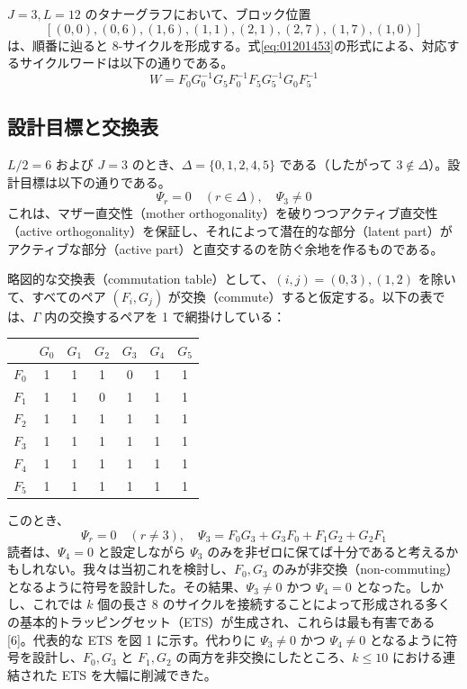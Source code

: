 \documentclass[a4paper,11pt,dvipdfmx]{jsarticle}
\theoremstyle{definition}
\begin{document}
$J = 3, L = 12$ のタナーグラフにおいて、ブロック位置
\[
[(0, 0), (0, 6), (1, 6), (1, 1), (2, 1), (2, 7), (1, 7), (1, 0)]
\]
は、順番に辿ると 8-サイクルを形成する。式\eqref{eq:01201453}の形式による、対応するサイクルワードは以下の通りである。
\[
W = F_0 G_0^{-1} G_5 F_0^{-1} F_5 G_5^{-1} G_0 F_5^{-1}
\]

\subsection{設計目標と交換表}

$L/2 = 6$ および $J = 3$ のとき、$\Delta = \{0, 1, 2, 4, 5\}$ である（したがって $3 \notin \Delta$）。設計目標は以下の通りである。
\[
\Psi_r = 0 \quad (r \in \Delta), \quad \Psi_3 \neq 0
\]
これは、マザー直交性（mother orthogonality）を破りつつアクティブ直交性（active orthogonality）を保証し、それによって潜在的な部分（latent part）がアクティブな部分（active part）と直交するのを防ぐ余地を作るものである。

略図的な交換表（commutation table）として、$(i, j) = (0, 3), (1, 2)$ を除いて、すべてのペア $(F_i, G_j)$ が交換（commute）すると仮定する。以下の表では、$\Gamma$ 内の交換するペアを 1 で網掛けしている：

\begin{table}[h]
\centering
\begin{tabular}{c|cccccc}
      & $G_0$ & $G_1$ & $G_2$ & $G_3$ & $G_4$ & $G_5$ \\ \hline
$F_0$ & 1     & 1     & 1     & 0     & 1     & 1     \\
$F_1$ & 1     & 1     & 0     & 1     & 1     & 1     \\
$F_2$ & 1     & 1     & 1     & 1     & 1     & 1     \\
$F_3$ & 1     & 1     & 1     & 1     & 1     & 1     \\
$F_4$ & 1     & 1     & 1     & 1     & 1     & 1     \\
$F_5$ & 1     & 1     & 1     & 1     & 1     & 1     \\
\end{tabular}
\end{table}

このとき、
\[
\Psi_r = 0 \quad (r \neq 3), \quad \Psi_3 = F_0 G_3 + G_3 F_0 + F_1 G_2 + G_2 F_1
\]
読者は、$\Psi_4 = 0$ と設定しながら $\Psi_3$ のみを非ゼロに保てば十分であると考えるかもしれない。我々は当初これを検討し、$F_0, G_3$ のみが非交換（non-commuting）となるように符号を設計した。その結果、$\Psi_3 \neq 0$ かつ $\Psi_4 = 0$ となった。しかし、これでは $k$ 個の長さ 8 のサイクルを接続することによって形成される多くの基本的トラッピングセット（ETS）が生成され、これらは最も有害である [6]。代表的な ETS を図 1 に示す。代わりに $\Psi_3 \neq 0$ かつ $\Psi_4 \neq 0$ となるように符号を設計し、$F_0, G_3$ と $F_1, G_2$ の両方を非交換にしたところ、$k \le 10$ における連結された ETS を大幅に削減できた。
\end{document}

